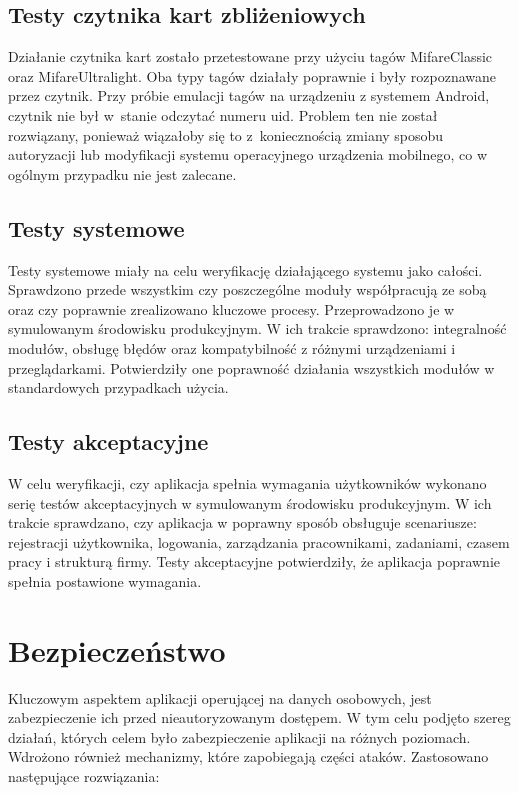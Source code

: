 \subsection{Testy czytnika kart zbliżeniowych}

Działanie czytnika kart zostało przetestowane przy użyciu tagów MifareClassic oraz MifareUltralight. Oba typy tagów działały poprawnie i były rozpoznawane przez czytnik. Przy próbie emulacji tagów na urządzeniu z systemem Android, czytnik nie był w~stanie odczytać numeru uid. Problem ten nie został rozwiązany, ponieważ wiązałoby się to z~koniecznością zmiany sposobu autoryzacji lub modyfikacji systemu operacyjnego urządzenia mobilnego, co w ogólnym przypadku nie jest zalecane.

\subsection{Testy systemowe}

Testy systemowe miały na celu weryfikację działającego systemu jako całości. Sprawdzono przede wszystkim czy poszczególne moduły współpracują ze sobą oraz czy poprawnie zrealizowano kluczowe procesy. Przeprowadzono je w symulowanym środowisku produkcyjnym. W ich trakcie sprawdzono: integralność modułów, obsługę błędów oraz kompatybilność z różnymi urządzeniami i przeglądarkami. Potwierdziły one poprawność działania wszystkich modułów w standardowych przypadkach użycia.

\subsection{Testy akceptacyjne}

W celu weryfikacji, czy aplikacja spełnia wymagania użytkowników wykonano serię testów akceptacyjnych w symulowanym środowisku produkcyjnym. W ich trakcie sprawdzano, czy aplikacja w poprawny sposób obsługuje scenariusze: rejestracji użytkownika, logowania, zarządzania pracownikami, zadaniami, czasem pracy i strukturą firmy. Testy akceptacyjne potwierdziły, że aplikacja poprawnie spełnia postawione wymagania.

\section{Bezpieczeństwo}

Kluczowym aspektem aplikacji operującej na danych osobowych, jest zabezpieczenie ich przed nieautoryzowanym dostępem. W tym celu podjęto szereg działań, których celem było zabezpieczenie aplikacji na różnych poziomach. Wdrożono również mechanizmy, które zapobiegają części ataków. Zastosowano następujące rozwiązania:

